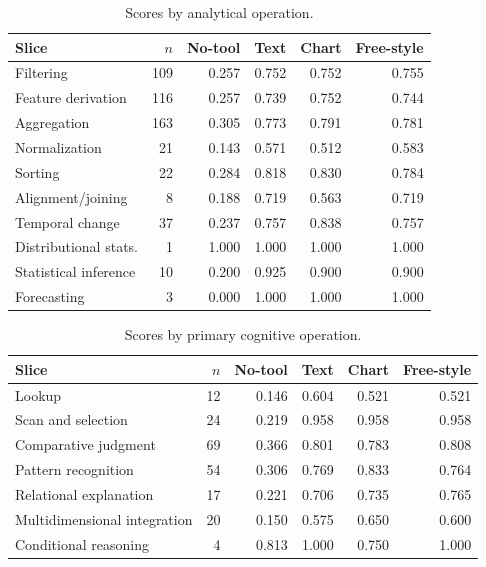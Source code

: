 \documentclass{article}
\begin{document}
\begin{table}[h]
  \caption{Scores by analytical operation.}
  \label{tab:operation-slices}
  \centering
  \scriptsize
  \setlength{\tabcolsep}{3.5pt}
  \begin{tabular}{lrrrrr}
    \toprule
    Slice & $n$ & No-tool & Text & Chart & Free-style \\
    \midrule
    Filtering             & 109 & 0.257 & 0.752 & 0.752 & 0.755 \\
    Feature derivation    & 116 & 0.257 & 0.739 & 0.752 & 0.744 \\
    Aggregation           & 163 & 0.305 & 0.773 & 0.791 & 0.781 \\
    Normalization         &  21 & 0.143 & 0.571 & 0.512 & 0.583 \\
    Sorting               &  22 & 0.284 & 0.818 & 0.830 & 0.784 \\
    Alignment/joining     &   8 & 0.188 & 0.719 & 0.563 & 0.719 \\
    Temporal change       &  37 & 0.237 & 0.757 & 0.838 & 0.757 \\
    Distributional stats. &   1 & 1.000 & 1.000 & 1.000 & 1.000 \\
    Statistical inference &  10 & 0.200 & 0.925 & 0.900 & 0.900 \\
    Forecasting           &   3 & 0.000 & 1.000 & 1.000 & 1.000 \\
    \bottomrule
  \end{tabular}
\end{table}

\begin{table}[h]
  \caption{Scores by primary cognitive operation.}
  \label{tab:cognitive-slices}
  \centering
  \scriptsize
  \setlength{\tabcolsep}{3.5pt}
  \begin{tabular}{lrrrrr}
    \toprule
    Slice & $n$ & No-tool & Text & Chart & Free-style \\
    \midrule
    Lookup                    & 12 & 0.146 & 0.604 & 0.521 & 0.521 \\
    Scan and selection        & 24 & 0.219 & 0.958 & 0.958 & 0.958 \\
    Comparative judgment      & 69 & 0.366 & 0.801 & 0.783 & 0.808 \\
    Pattern recognition       & 54 & 0.306 & 0.769 & 0.833 & 0.764 \\
    Relational explanation    & 17 & 0.221 & 0.706 & 0.735 & 0.765 \\
    Multidimensional integration & 20 & 0.150 & 0.575 & 0.650 & 0.600 \\
    Conditional reasoning     &  4 & 0.813 & 1.000 & 0.750 & 1.000 \\
    \bottomrule
  \end{tabular}
\end{table}
\end{document}
